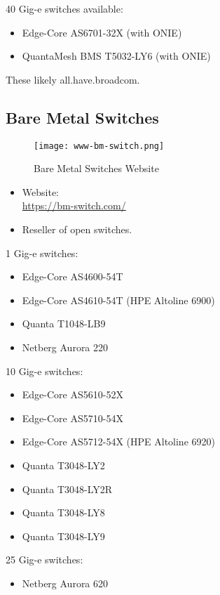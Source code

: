 40 Gig-e switches available:
\begin{itemize}
 \item Edge-Core AS6701-32X (with ONIE)
 \item QuantaMesh BMS T5032-LY6 (with ONIE)
\end{itemize}


These likely all.have.broadcom.


\subsection{Bare Metal Switches}
\begin{figure}[h!]
\texttt{[image: www-bm-switch.png]}
 \caption{Bare Metal Switches Website}
 \label{fig:www-bm-switch}
\end{figure}


\begin{itemize}
 \item Website: \\ \url{https://bm-switch.com/}
 \item Reseller of open switches.
\end{itemize}


1 Gig-e switches:
\begin{itemize}
 \item Edge-Core AS4600-54T
 \item Edge-Core AS4610-54T (HPE Altoline 6900)
 \item Quanta T1048-LB9
 \item Netberg Aurora 220
\end{itemize}


10 Gig-e switches:
\begin{itemize}
 \item Edge-Core AS5610-52X
 \item Edge-Core AS5710-54X
 \item Edge-Core AS5712-54X (HPE Altoline 6920)
 \item Quanta T3048-LY2
 \item Quanta T3048-LY2R
 \item Quanta T3048-LY8
 \item Quanta T3048-LY9
\end{itemize}


25 Gig-e switches:
\begin{itemize}
 \item Netberg Aurora 620
\end{itemize}


